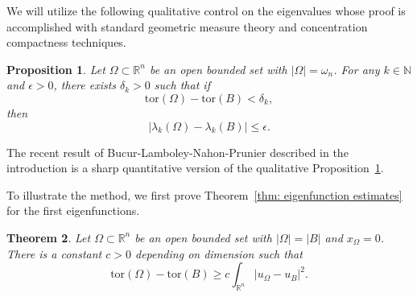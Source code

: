 \documentclass[10pt,a4paper]{amsart}
\numberwithin{equation}{section}
\newtheorem{theorem}{Theorem}[section]
\newtheorem{proposition}[theorem]{Proposition}
\def\R{{\mathbb R}}
\def\W{\Omega}
\def\om{\omega}
\def\tor{\mathrm{tor}}
\begin{document}
We will utilize the following qualitative control on the eigenvalues whose proof is accomplished with standard geometric measure theory and concentration compactness techniques. 
\begin{proposition} \label{p:standard}
 Let $\W\subset\R^n$ be an open bounded set with $|\W|=\om_n$. For any $k \in \mathbb{N}$ and $\epsilon >0$, there exists $\delta_k >0$ such that if 
 \[
 \tor(\W)-\tor(B) < \delta_k, 
 \]
 then 
 \[
  |\lambda_k(\W) -\lambda_k(B)| \leq \epsilon.  
 \]
\end{proposition}
The recent result of Bucur-Lamboley-Nahon-Prunier described in the introduction is a sharp quantitative version of the qualitative Proposition~\ref{p:standard}.

To illustrate the method, we first prove Theorem~\ref{thm: eigenfunction estimates} for the first eigenfunctions. 

\begin{theorem} \label{t:first}
 Let $\W\subset \mathbb{R}^n$ be an open bounded set with $|\W|=|B|$ and $x_\W = 0$. There is a constant $c>0$ depending on dimension such that 
 \[
 \tor(\W)-\tor(B) \geq c \int_{\mathbb{R}^n} |u_{\W}-u_{B}|^2. 
 \]
\end{theorem}
\end{document}
